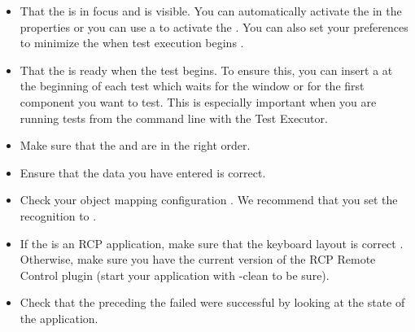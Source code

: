 \begin{itemize}
\item That the \gdaut{} is in focus and is visible. You can automatically activate the \gdaut{} in the \gdaut{} properties  or you can use a \gdcase{} to activate the \gdaut{}. You can also set your preferences to minimize the \ite{} when test execution begins . 
\item That the \gdaut{} is ready when the test begins. To ensure this, you can insert a \gdcase{} at the beginning of each test which waits for the window or for the first component you want to test. This is especially important when you are running tests from the command line with the Test Executor. 

\item Make sure that the \gdcases{} and \gdsteps{} are in the right order.
\item Ensure that the data you have entered is correct.
\item Check your object mapping configuration . We recommend that you set the recognition to .
\item If the \gdaut{} is an RCP application, make sure that the keyboard layout is correct . Otherwise, make sure you have the current version of the RCP Remote Control plugin (start your application with -clean to be sure).  
\item Check that the \gdsteps{} preceding the failed \gdstep{} were successful by looking at the state of the application.  
\end{itemize}
